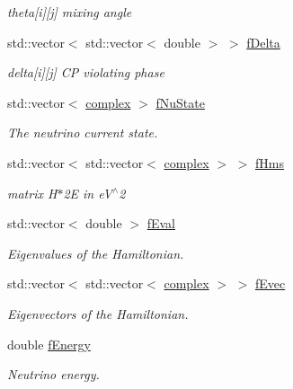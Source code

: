 \begin{DoxyCompactItemize}
\begin{DoxyCompactList}\small\item\em theta\mbox{[}i\mbox{]}\mbox{[}j\mbox{]} mixing angle \end{DoxyCompactList}\item 
std\+::vector$<$ std\+::vector$<$ double $>$ $>$ \hyperlink{classOscProb_1_1PMNS__Base_ab2a5fa40e689b221c8a7d2c17213810d}{f\+Delta}
\begin{DoxyCompactList}\small\item\em delta\mbox{[}i\mbox{]}\mbox{[}j\mbox{]} CP violating phase \end{DoxyCompactList}\item 
std\+::vector$<$ \hyperlink{classOscProb_1_1PMNS__Base_ae86ec4718808ce9d02e5f5b4226714ab}{complex} $>$ \hyperlink{classOscProb_1_1PMNS__Base_ad38a7107c3ab393591fd5ba21658300b}{f\+Nu\+State}
\begin{DoxyCompactList}\small\item\em The neutrino current state. \end{DoxyCompactList}\item 
std\+::vector$<$ std\+::vector$<$ \hyperlink{classOscProb_1_1PMNS__Base_ae86ec4718808ce9d02e5f5b4226714ab}{complex} $>$ $>$ \hyperlink{classOscProb_1_1PMNS__Base_adf5901166216e8c7a5cff2092952f473}{f\+Hms}
\begin{DoxyCompactList}\small\item\em matrix H$\ast$2E in e\+V$^\wedge$2 \end{DoxyCompactList}\item 
std\+::vector$<$ double $>$ \hyperlink{classOscProb_1_1PMNS__Base_a6319c34d7decbb9d7d6da279c06e8c2d}{f\+Eval}
\begin{DoxyCompactList}\small\item\em Eigenvalues of the Hamiltonian. \end{DoxyCompactList}\item 
std\+::vector$<$ std\+::vector$<$ \hyperlink{classOscProb_1_1PMNS__Base_ae86ec4718808ce9d02e5f5b4226714ab}{complex} $>$ $>$ \hyperlink{classOscProb_1_1PMNS__Base_a093e7bd31d4ef52ed52df414e12c1d17}{f\+Evec}
\begin{DoxyCompactList}\small\item\em Eigenvectors of the Hamiltonian. \end{DoxyCompactList}\item 
double \hyperlink{classOscProb_1_1PMNS__Base_a2800af6d436972f3e900867790c046b0}{f\+Energy}
\begin{DoxyCompactList}\small\item\em Neutrino energy. \end{DoxyCompactList}\item 

\end{DoxyCompactItemize}
